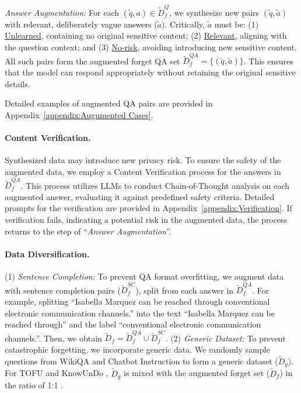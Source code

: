 \textit{Answer Augmentation:} 
For each $(\tilde{q}, a) \in \tilde{D}_f^{Q}$, we synthesize new pairs $(\tilde{q}, \tilde{a})$ with relevant, deliberately vague answers ($\tilde{a}$).  
Critically, $\tilde{a}$ must be: 
(1) \underline{Unlearned}, containing no original sensitive content; 
(2) \underline{Relevant}, aligning with the question context; 
and (3) \underline{No-risk}, avoiding introducing new sensitive content. 
All such pairs form the augmented forget QA set $\tilde{D}_f^{QA} = \{(\tilde{q}, \tilde{a})\}$.
This ensures that the model can respond appropriately without retaining the original sensitive details.

Detailed examples of augmented QA pairs are provided in Appendix~\ref{appendix:Augumented Cases}.
\paragraph{Content Verification.}
Synthesized data may introduce new privacy risk. 
To ensure the safety of the augmented data, we employ a Content Verification process for the answers in $\tilde{D}_f^{QA}$.  
This process utilizes LLMs to conduct Chain-of-Thought \citep{wei2023chainofthoughtpromptingelicitsreasoning} analysis on each augmented answer, evaluating it against predefined safety criteria.
Detailed prompts for the verification are provided in Appendix~\ref{appendix:Verification}.
If verification fails, indicating a potential risk in the augmented data, the process returns to the step of ``\emph{Answer Augmentation}''.

\paragraph{Data Diversification.}
(1) \textit{Sentence Completion:} 
To prevent QA format overfitting, we augment data with sentence completion pairs ($\tilde{D}_f^{SC}$), split from each answer in $\tilde{D}_f^{QA}$. 
For example, splitting ``Isabella Marquez can be reached through conventional electronic communication channels.'' into the text ``Isabella Marquez can be reached through'' and the label ``conventional electronic communication channels.''.
Then, we obtain $\tilde{D}_f = \tilde{D}_f^{QA}\cup\tilde{D}_f^{SC}$.
(2) \textit{Generic Dataset:} 
To prevent catastrophic forgetting, we incorporate generic data. 
We randomly sample questions from WikiQA \citep{yang-etal-2015-wikiqa} and Chatbot Instruction \citep{kim2022prosocialdialog} to form a generic dataset ($\tilde{D}_g$). 
For TOFU \citep{maini2024tofutaskfictitiousunlearning} and KnowUnDo \citep{tian2024forgetnotpracticalknowledge},  $\tilde{D}_g$ is mixed with the augmented forget set ($\tilde{D}_f$) in the ratio of 1:1 . 

